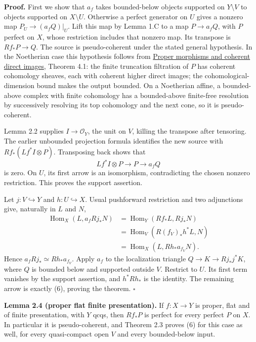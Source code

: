 \documentclass[11pt]{article}
\begin{document}
\textbf{Proof.} First we show that \(a_f\) takes bounded-below objects
supported on \(Y\setminus V\) to objects supported on \(X\setminus U\).
Otherwise a perfect generator on \(U\) gives a nonzero map
\(P_U\to(a_fQ)|_U\). Lift this map by Lemma 1.C to a map \(P\to a_fQ\),
with \(P\) perfect on \(X\), whose restriction includes that nonzero
map. Its transpose is \(Rf_*P\to Q\). The source is pseudo-coherent
under the stated general hypothesis. In the Noetherian case this
hypothesis follows from
\href{proper-morphisms-and-coherent-direct-images.md}{Proper morphisms
and coherent direct images}, Theorem 4.1: the finite truncation
filtration of \(P\) has coherent cohomology sheaves, each with coherent
higher direct images; the cohomological-dimension bound makes the output
bounded. On a Noetherian affine, a bounded-above complex with finite
cohomology has a bounded-above finite-free resolution by successively
resolving its top cohomology and the next cone, so it is
pseudo-coherent.

Lemma 2.2 supplies \(I\to\mathcal O_Y\), the unit on \(V\), killing the
transpose after tensoring. The earlier unbounded projection formula
identifies the new source with \(Rf_*(Lf^*I\otimes P)\). Transposing
back shows that \[
Lf^*I\otimes P\longrightarrow P\longrightarrow a_fQ
\] is zero. On \(U\), its first arrow is an isomorphism, contradicting
the chosen nonzero restriction. This proves the support assertion.

Let \(j:V\hookrightarrow Y\) and \(h:U\hookrightarrow X\). Usual
pushforward restriction and two adjunctions give, naturally in \(L\) and
\(N\), \[
\begin{aligned}
\operatorname{Hom}_X(L,a_fRj_*N)
&=\operatorname{Hom}_Y(Rf_*L,Rj_*N)\\
&=\operatorname{Hom}_V(R(f_V)_*h^*L,N)\\
&=\operatorname{Hom}_X(L,Rh_*a_{f_V}N).
\end{aligned}
\] Hence \(a_fRj_*\simeq Rh_*a_{f_V}\). Apply \(a_f\) to the
localization triangle \(Q\to K\to Rj_*j^*K\), where \(Q\) is bounded
below and supported outside \(V\). Restrict to \(U\). Its first term
vanishes by the support assertion, and \(h^*Rh_*\) is the identity. The
remaining arrow is exactly (6), proving the theorem. \(\square\)

\textbf{Lemma 2.4 (proper flat finite presentation).} If \(f:X\to Y\) is
proper, flat and of finite presentation, with \(Y\) qcqs, then \(Rf_*P\)
is perfect for every perfect \(P\) on \(X\). In particular it is
pseudo-coherent, and Theorem 2.3 proves (6) for this case as well, for
every quasi-compact open \(V\) and every bounded-below input.
\end{document}
